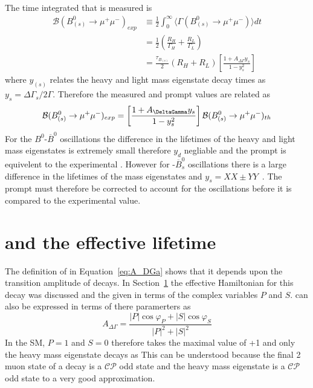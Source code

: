 The time integrated \BF that is measured is
\begin{align}
  \mathcal{B}(B^{0}_{(s)} \to \mu^{+}\mu^{-})_{exp} &\equiv \frac{1}{2} \int^{\infty}_0 \langle \Gamma (B^{0}_{(s)} \to \mu^{+}\mu^{-}) \rangle  dt \nonumber \\
&= \frac{1}{2} \left( \frac{R_{H}}{\Gamma_{H}} + \frac{R_{L}}{\Gamma_{L}} \right) \nonumber \\
&= \frac{\tau_{B_{(s)}}}{2}(R_{H} + R_{L}) \left[ \frac{1 + A_{\Delta\Gamma}y_{s}}{1 - y_{s}^{2}} \right]
\end{align}
where $y_{(s)}$ relates the heavy and light mass eigenstate decay times as $y_s = \Delta \Gamma_s / 2\Gamma$. Therefore the measured and prompt \BF values are related as
\begin{equation}
  \mathcal{B}(B^0_{(s)} \to \mu^+\mu^-)_{exp} = \left[ \frac{1 + A_{\DeltaGamma}y_{s}}{1 - y_{s}^{2}} \right] \mathcal{B}(B^0_{(s)} \to \mu^+ \mu^-)_{th}
\end{equation}
For the $B^0$-$\overline{B}^0$ oscillations the difference in the lifetimes of the heavy and light mass eigenstates is extremely small therefore $y_d$ negliable and the prompt \BF is equivelent to the experimental \BF. However for \bs-$\overline{B}^0_s$ oscillations there is a large difference in the lifetimes of the mass eigenstates and $y_s =XX \pm YY$~\cite{}. The prompt \BF must therefore be corrected to account for the oscillations before it is compared to the experimental value.
\section{\ADG and the effective lifetime}
The definition of \ADG in Equation~\ref{eq:A_DGa} shows that it depends upon the transition amplitude of \bsmumu decays. In Section~\ref{} the effective Hamiltonian for this decay was discussed and the \BF given in terms of the complex variables $P$ and $S$. \ADG can also be expressed in terms of there paramerters as~\cite{}
\begin{equation}
A_{\Delta \Gamma} = \frac{|P|\cos \varphi_P + |S| \cos \varphi_S}{|P|^2 + |S|^2}
\label{eq:NP_ADG}
\end{equation}
In the SM, $P=1$ and $S=0$ therefore \ADG takes the maximal value of +1 and only the heavy mass eigenstate decays as \bsmumu This can be understood because the final 2 muon state of a \bsmumu decay is a $\mathcal{CP}$ odd state and the heavy \bs mass eigenstate is a $\mathcal{CP}$ odd state to a very good approximation.

